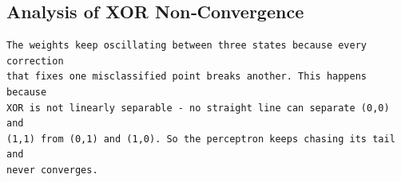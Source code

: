 \documentclass[11pt]{article}
\begin{document}
\subsection*{Analysis of XOR Non‑Convergence}

\begin{verbatim}
The weights keep oscillating between three states because every correction 
that fixes one misclassified point breaks another. This happens because 
XOR is not linearly separable - no straight line can separate (0,0) and 
(1,1) from (0,1) and (1,0). So the perceptron keeps chasing its tail and 
never converges.
\end{verbatim}
\end{document}
